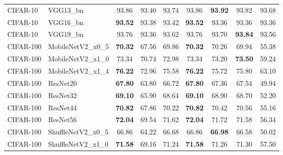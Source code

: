 \begin{table}[h!]
{\begin{tabular}{llccccccc}
 CIFAR-10 &          VGG13\_bn &                  93.86 &                  93.40 &                  93.74 &                  93.86 & \textbf{93.92} &                  93.82 &                  93.68 \\
 CIFAR-10 &          VGG16\_bn & \textbf{93.52} &                  93.38 &                  93.42 & \textbf{93.52} &                  93.36 &                  93.36 &                  93.36 \\
 CIFAR-10 &          VGG19\_bn &                  93.76 &                  93.36 &                  93.62 &                  93.76 &                  93.70 & \textbf{93.84} &                  93.56 \\
CIFAR-100 &  MobileNetV2\_x0\_5 & \textbf{70.32} &                  67.56 &                  69.86 & \textbf{70.32} &                  70.26 &                  69.94 &                  55.38 \\
CIFAR-100 &  MobileNetV2\_x1\_0 &                  73.34 &                  70.74 &                  72.98 &                  73.34 &                  73.20 & \textbf{73.50} &                  59.24 \\
CIFAR-100 &  MobileNetV2\_x1\_4 & \textbf{76.22} &                  72.96 &                  75.58 & \textbf{76.22} &                  75.72 &                  75.80 &                  63.10 \\
CIFAR-100 &          ResNet20 & \textbf{67.80} &                  63.80 &                  66.72 & \textbf{67.80} &                  67.36 &                  67.54 &                  49.94 \\
CIFAR-100 &          ResNet32 & \textbf{69.10} &                  65.90 &                  68.64 & \textbf{69.10} &                  68.90 &                  68.70 &                  52.20 \\
CIFAR-100 &          ResNet44 & \textbf{70.82} &                  67.86 &                  70.22 & \textbf{70.82} &                  70.42 &                  70.56 &                  55.16 \\
CIFAR-100 &          ResNet56 & \textbf{72.04} &                  69.54 &                  71.62 & \textbf{72.04} &                  71.72 &                  71.58 &                  56.34 \\
CIFAR-100 & ShuffleNetV2\_x0\_5 &                  66.86 &                  64.22 &                  66.68 &                  66.86 & \textbf{66.98} &                  66.58 &                  50.02 \\
CIFAR-100 & ShuffleNetV2\_x1\_0 & \textbf{71.58} &                  69.16 &                  71.24 & \textbf{71.58} &                  71.26 &                  71.30 &                  57.50 \\

\end{tabular}}
\end{table}
